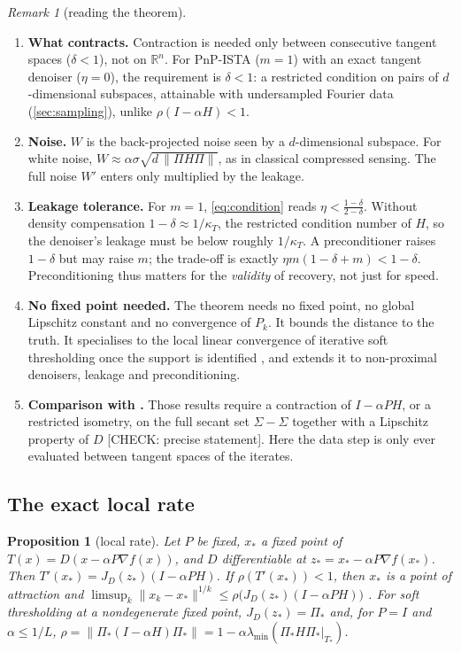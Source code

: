\documentclass[11pt]{article}
\newtheorem{proposition}[theorem]{Proposition}
\theoremstyle{definition}
\theoremstyle{remark}
\newtheorem{remark}[theorem]{Remark}
\newcommand{\RR}{\mathbb R}
\newcommand{\norm}[1]{\lVert #1\rVert}
\newcommand{\lmin}{\lambda_{\min}}
\newcommand{\chk}[1]{\textcolor{red!70!black}{[CHECK: #1]}}
\begin{document}
\begin{remark}[reading the theorem]\label{rem:reading}
\begin{enumerate}
\item \textbf{What contracts.} Contraction is needed only between consecutive tangent spaces ($\delta<1$), not on
  $\RR^n$. For PnP-ISTA ($m=1$) with an exact tangent denoiser ($\eta=0$), the requirement is $\delta<1$: a
  restricted condition on pairs of $d$-dimensional subspaces, attainable with undersampled Fourier data
  (\cref{sec:sampling}), unlike $\rho(I-\alpha H)<1$.
\item \textbf{Noise.} $W$ is the back-projected noise seen by a $d$-dimensional subspace. For white noise,
  $W\approx\alpha\sigma\sqrt{d\,\norm{\Pi H\Pi}}$, as in classical compressed sensing. The full noise $W'$ enters
  only multiplied by the leakage.
\item \textbf{Leakage tolerance.} For $m=1$, \eqref{eq:condition} reads $\eta<\frac{1-\delta}{2-\delta}$. Without
  density compensation $1-\delta\approx1/\kappa_T$, the restricted condition number of $H$, so the denoiser's
  leakage must be below roughly $1/\kappa_T$. A preconditioner raises $1-\delta$ but may raise $m$; the trade-off
  is exactly $\eta m(1-\delta+m)<1-\delta$. Preconditioning thus matters for the \emph{validity} of recovery,
  not just for speed.
\item \textbf{No fixed point needed.} The theorem needs no fixed point, no global Lipschitz constant and no
  convergence of $P_k$. It bounds the distance to the truth. It specialises to the local linear convergence of
  iterative soft thresholding once the support is identified \cite{bredies2008,hale2008,liang2017fb}, and extends
  it to non-proximal denoisers, leakage and preconditioning.
\item \textbf{Comparison with \cite{liu2021pnprec,joundi2025}.} Those results require a contraction of
  $I-\alpha PH$, or a restricted isometry, on the full secant set $\Sigma-\Sigma$ together with a Lipschitz property
  of $D$ \chk{precise statement}. Here the data step is only ever evaluated between tangent spaces of the
  iterates.
\end{enumerate}
\end{remark}

\subsection{The exact local rate}

\begin{proposition}[local rate]\label{prop:local}
Let $P$ be fixed, $x_*$ a fixed point of $T(x)=D(x-\alpha P\nabla f(x))$, and $D$ differentiable at
$z_*=x_*-\alpha P\nabla f(x_*)$. Then $T'(x_*)=J_D(z_*)(I-\alpha PH)$. If $\rho(T'(x_*))<1$, then $x_*$ is a point
of attraction and $\limsup_k\norm{x_k-x_*}^{1/k}\leq\rho\big(J_D(z_*)(I-\alpha PH)\big)$ \cite[10.1.3--10.1.4]{ortega1970}.
For soft thresholding at a nondegenerate fixed point, $J_D(z_*)=\Pi_*$ and, for $P=I$ and $\alpha\le 1/L$,
$\rho=\norm{\Pi_*(I-\alpha H)\Pi_*}=1-\alpha\lmin(\Pi_*H\Pi_*|_{T_*})$.
\end{proposition}
\end{document}
